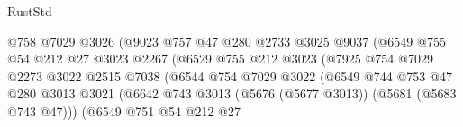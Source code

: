 \begin{lexlean}{RustStd}
\begin{coremodule}
                                        @758
                                        @7029
                                        @3026
                                        (@9023
                                          @757
                                          @47
                                          @280
                                          @2733
                                          @3025
                                          @9037
                                          (@6549
                                            @755
                                            @54
                                            @212
                                            @27
                                            @3023
                                            @2267
                                            (@6529
                                              @755
                                              @212
                                              @3023
                                              (@7925
                                                @754
                                                @7029
                                                @2273
                                                @3022
                                                @2515
                                                @7038
                                                (@6544
                                                  @754
                                                  @7029
                                                  @3022
                                                  (@6549
                                                    @744
                                                    @753
                                                    @47
                                                    @280
                                                    @3013
                                                    @3021
                                                    (@6642
                                                      @743
                                                      @3013
                                                      (@5676 (@5677 @3013))
                                                      (@5681 (@5683 @743 @47)))
                                                    (@6549
                                                      @751
                                                      @54
                                                      @212
                                                      @27

\end{coremodule}
\end{lexlean}
